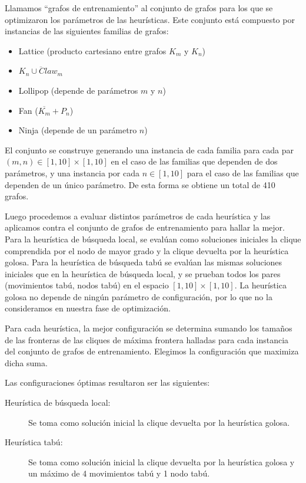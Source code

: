 \documentclass[a4paper, 10pt, twoside]{article}
\begin{document}
Llamamos ``grafos de entrenamiento'' al conjunto de grafos para los que se optimizaron los parámetros de las heurísticas. Este conjunto está compuesto por instancias de las siguientes familias de grafos:

\begin{itemize}
	\item Lattice (producto cartesiano entre grafos $K_m$ y $K_n$)
	\item $\overline{K_n \cup Claw_m}$
	\item Lollipop (depende de parámetros $m$ y $n$)
	\item Fan ($\overline{K_m} + P_n$)
	\item Ninja (depende de un parámetro $n$)
\end{itemize}

El conjunto se construye generando una instancia de cada familia para cada par $(m, n) \in [1, 10] \times [1, 10]$ en el caso de las familias que dependen de dos parámetros, y una instancia por cada $n \in [1, 10]$ para el caso de las familias que dependen de un único parámetro. De esta forma se obtiene un total de 410 grafos.

Luego procedemos a evaluar distintos parámetros de cada heurística y las aplicamos contra el conjunto de grafos de entrenamiento para hallar la mejor. Para la heurística de búsqueda local, se evalúan como soluciones iniciales la clique comprendida por el nodo de mayor grado y la clique devuelta por la heurística golosa. Para la heurística de búsqueda tabú se evalúan las mismas soluciones iniciales que en la heurística de búsqueda local, y se prueban todos los pares (movimientos tabú, nodos tabú) en el espacio $[1, 10] \times [1, 10]$. La heurística golosa no depende de ningún parámetro de configuración, por lo que no la consideramos en nuestra fase de optimización.

Para cada heurística, la mejor configuración se determina sumando los tamaños de las fronteras de las cliques de máxima frontera halladas para cada instancia del conjunto de grafos de entrenamiento. Elegimos la configuración que maximiza dicha suma.

Las configuraciones óptimas resultaron ser las siguientes:

\begin{description}
	\item[Heurística de búsqueda local:] Se toma como solución inicial la clique devuelta por la heurística golosa.
	\item[Heurística tabú:] Se toma como solución inicial la clique devuelta por la heurística golosa y un máximo de 4 movimientos tabú y 1 nodo tabú.
\end{description}
\end{document}
